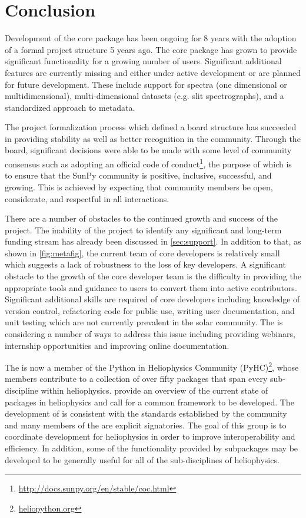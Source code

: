 \section{Conclusion}
\label{sec:conclusion}

Development of the \sunpypkg core package has been ongoing for 8 years with the adoption of a formal project structure 5 years ago.
The core package has grown to provide significant functionality for a growing number of users.
Significant additional features are currently missing and either under active development or are planned for future development.
These include support for spectra (one dimensional or multidimensional), multi-dimensional datasets (e.g. slit spectrographs), and a standardized approach to metadata.

The project formalization process which defined a board structure has succeeded in providing stability as well as better recognition in the community.
Through the board, significant decisions were able to be made with some level of community consensus such as adopting an official code of conduct\footnote{\url{http://docs.sunpy.org/en/stable/coc.html}}, the purpose of which is to ensure that the SunPy community is positive, inclusive, successful, and growing.
This is achieved by expecting that community members be open, considerate, and respectful in all interactions.

There are a number of obstacles to the continued growth and success of the project. The inability of the project to identify any significant and long-term funding stream has already been discussed in \autoref{sec:support}.
In addition to that, as shown in \autoref{fig:metafig}, the current team of core developers is relatively small which suggests a lack of robustness to the loss of key developers.
A significant obstacle to the growth of the core developer team is the difficulty in providing the appropriate tools and guidance to users to convert them into active contributors.
Significant additional skills are required of core developers including knowledge of version control, refactoring code for public use, writing user documentation, and unit testing which are not currently prevalent in the solar community.
The \sunpyproj is considering a number of ways to address this issue including providing webinars, internship opportunities and improving online documentation.

The \sunpyproj is now a member of the Python in Heliophysics Community (PyHC)\footnote{\url{heliopython.org}}, whose members contribute to a collection of over fifty \python packages that span every sub-discipline within heliophysics.
\citet{snakes} provide an overview of the current state of \python packages in heliophysics and call for a common framework to be developed.
The development of \sunpypkg is consistent with the standards established by the community \citep{pyhcStandards} and many members of the \sunpyproj are explicit signatories.
The goal of this group is to coordinate \python development for heliophysics in order to improve interoperability and efficiency.
In addition, some of the functionality provided by \sunpypkg subpackages may be developed to be generally useful for all of the sub-disciplines of heliophysics.
